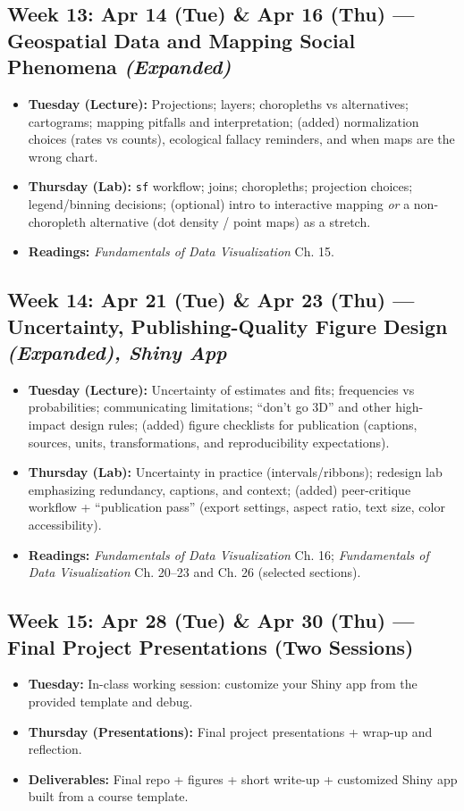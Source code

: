 \documentclass[letterpaper,11pt]{article}
\newcommand{\FDV}{\emph{Fundamentals of Data Visualization}}
\newcommand{\compresslist}{
\setlength{\itemsep}{1pt}
\setlength{\parskip}{0pt}
\setlength{\parsep}{0pt}
}
\begin{document}
\subsection*{Week 13: Apr 14 (Tue) \& Apr 16 (Thu) --- Geospatial Data and Mapping Social Phenomena \textit{(Expanded)}} 
\begin{itemize}\compresslist
\item \textbf{Tuesday (Lecture):} Projections; layers; choropleths vs alternatives; cartograms; mapping pitfalls and interpretation; (added) normalization choices (rates vs counts), ecological fallacy reminders, and when maps are the wrong chart.
\item \textbf{Thursday (Lab):} \texttt{sf} workflow; joins; choropleths; projection choices; legend/binning decisions; (optional) intro to interactive mapping \emph{or} a non-choropleth alternative (dot density / point maps) as a stretch.
\item \textbf{Readings:} \FDV{} Ch. 15.
\end{itemize}

\subsection*{Week 14: Apr 21 (Tue) \& Apr 23 (Thu) --- Uncertainty, Publishing-Quality Figure Design \textit{(Expanded), Shiny App}} 
\begin{itemize}\compresslist
\item \textbf{Tuesday (Lecture):} Uncertainty of estimates and fits; frequencies vs probabilities; communicating limitations; ``don’t go 3D'' and other high-impact design rules; (added) figure checklists for publication (captions, sources, units, transformations, and reproducibility expectations).
\item \textbf{Thursday (Lab):} Uncertainty in practice (intervals/ribbons); redesign lab emphasizing redundancy, captions, and context; (added) peer-critique workflow + ``publication pass'' (export settings, aspect ratio, text size, color accessibility).
\item \textbf{Readings:} \FDV{} Ch. 16; \FDV{} Ch. 20--23 and Ch. 26 (selected sections).
\end{itemize}

\subsection*{Week 15: Apr 28 (Tue) \& Apr 30 (Thu) --- \textbf{Final Project Presentations (Two Sessions)}}
\begin{itemize}\compresslist
\item \textbf{Tuesday:} In-class working session: customize your Shiny app from the provided template and debug.
\item \textbf{Thursday (Presentations):} Final project presentations + wrap-up and reflection.
\item \textbf{Deliverables:} Final repo + figures + short write-up + customized Shiny app built from a course template.
\end{itemize}
\end{document}
